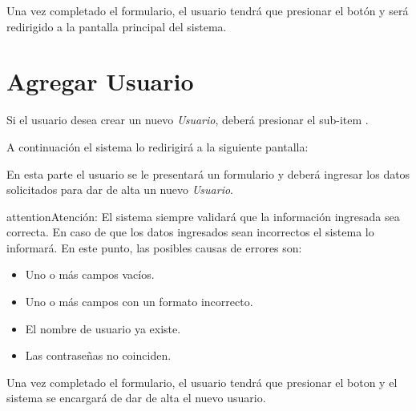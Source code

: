 \documentclass[a4paper,10pt,spanish]{sphinxmanual}
\begin{document}
Una vez completado el formulario, el usuario tendrá que presionar el botón  y será redirigido a la pantalla principal del sistema.



\section{Agregar Usuario}
\label{agregarusuario::doc}\label{agregarusuario:agregar-usuario}
Si el usuario desea crear un nuevo \emph{Usuario}, deberá presionar el sub-item .


A continuación el sistema lo redirigirá a la siguiente pantalla:


En esta parte el usuario se le presentará un formulario y deberá ingresar los datos solicitados para dar de alta un nuevo \emph{Usuario}.

\begin{notice}{attention}{Atención:}
El sistema siempre validará que la información ingresada sea correcta. En caso de que los datos ingresados sean incorrectos el sistema lo informará.
En este punto, las posibles causas de errores son:
\begin{itemize}
\item {} 
Uno o más campos vacíos.

\item {} 
Uno o más campos con un formato incorrecto.

\item {} 
El nombre de usuario ya existe.

\item {} 
Las contraseñas no coinciden.

\end{itemize}
\end{notice}

Una vez completado el formulario, el usuario tendrá que presionar el boton  y el sistema se encargará de dar de alta el nuevo usuario.
\end{document}

